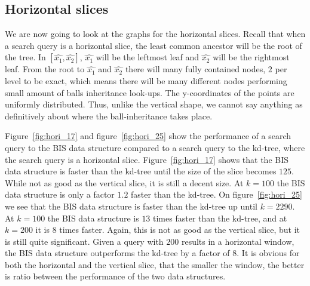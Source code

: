 \subsection{Horizontal slices}

We are now going to look at the graphs for the horizontal slices. Recall that when a search query is a horizontal slice, the least common ancestor will be the root of the tree. In $[\hat{x_1}, \hat{x_2}]$, $\hat{x_1}$ will be the leftmost leaf and $\hat{x_2}$ will be the rightmost leaf. From the root to $\hat{x_1}$ and $\hat{x_2}$ there will many fully contained nodes, $2$ per level to be exact, which means there will be many different nodes performing small amount of balls inheritance look-ups. The y-coordinates of the points are uniformly distributed. Thus, unlike the vertical shape, we cannot say anything as definitively about where the ball-inheritance takes place. 

Figure~\ref{fig:hori_17} and figure~\ref{fig:hori_25} show the performance of a search query to the BIS data structure compared to a search query to the kd-tree, where the search query is a horizontal slice. Figure~\ref{fig:hori_17} shows that the BIS data structure is faster than the kd-tree until the size of the slice becomes $125$. While not as good as the vertical slice, it is still a decent size. At $k = 100$ the BIS data structure is only a factor $1.2$ faster than the kd-tree. On figure~\ref{fig:hori_25} we see that the BIS data structure is faster than the kd-tree up until $k = 2290$. At $k = 100$ the BIS data structure is $13$ times faster than the kd-tree, and at $k = 200$ it is $8$ times faster. Again, this is not as good as the vertical slice, but it is still quite significant. Given a query with $200$ results in a horizontal window, the BIS data structure outperforms the kd-tree by a factor of $8$. It is obvious for both the horizontal and the vertical slice, that the smaller the window, the better is ratio between the performance of the two data structures.


